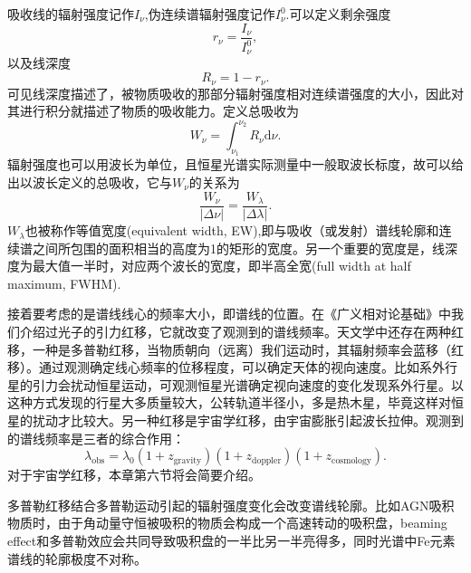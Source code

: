 \documentclass[../天体物理基础.tex]{subfiles}
\begin{document}
吸收线的辐射强度记作$I_{\nu}$,伪连续谱辐射强度记作$I_{\nu}^{0}$.可以定义剩余强度
\begin{equation}
r_{\nu}=\frac{I_{\nu}}{I_{\nu}^{0}},
\end{equation}
以及线深度
\begin{equation}
R_{\nu}=1-r_{\nu}.
\end{equation}
可见线深度描述了，被物质吸收的那部分辐射强度相对连续谱强度的大小，因此对其进行积分就描述了物质的吸收能力。定义总吸收为
\begin{equation}
W_{\nu}=\int_{\nu_{1}}^{\nu_{2}}R_{\nu}\mathrm{d}\nu.
\end{equation}
辐射强度也可以用波长为单位，且恒星光谱实际测量中一般取波长标度，故可以给出以波长定义的总吸收，它与$W_{\nu}$的关系为
\begin{equation}
\frac{W_{\nu}}{\left\vert{}\Delta{}\nu\right\vert{}}=\frac{W_{\lambda}}{\left\vert{}\Delta{}\lambda\right\vert{}}.
\end{equation}
$W_{\lambda}$也被称作等值宽度(equivalent width, EW),即与吸收（或发射）谱线轮廓和连续谱之间所包围的面积相当的高度为1的矩形的宽度。另一个重要的宽度是，线深度为最大值一半时，对应两个波长的宽度，即半高全宽(full width at half maximum, FWHM).

接着要考虑的是谱线线心的频率大小，即谱线的位置。在《广义相对论基础》中我们介绍过光子的引力红移，它就改变了观测到的谱线频率。天文学中还存在两种红移，一种是多普勒红移，当物质朝向（远离）我们运动时，其辐射频率会蓝移（红移）。通过观测确定线心频率的位移程度，可以确定天体的视向速度。比如系外行星的引力会扰动恒星运动，可观测恒星光谱确定视向速度的变化发现系外行星。以这种方式发现的行星大多质量较大，公转轨道半径小，多是热木星，毕竟这样对恒星的扰动才比较大。另一种红移是宇宙学红移，由宇宙膨胀引起波长拉伸。观测到的谱线频率是三者的综合作用：
\begin{equation}
\lambda_{\text{obs}}=\lambda_{0}\left(1+z_{\text{gravity}}\right)\left(1+z_{\text{doppler}}\right)\left(1+z_{\text{cosmology}}\right).
\end{equation}
对于宇宙学红移，本章第六节将会简要介绍。

多普勒红移结合多普勒运动引起的辐射强度变化会改变谱线轮廓。比如AGN吸积物质时，由于角动量守恒被吸积的物质会构成一个高速转动的吸积盘，beaming effect和多普勒效应会共同导致吸积盘的一半比另一半亮得多，同时光谱中Fe元素谱线的轮廓极度不对称。
\end{document}
